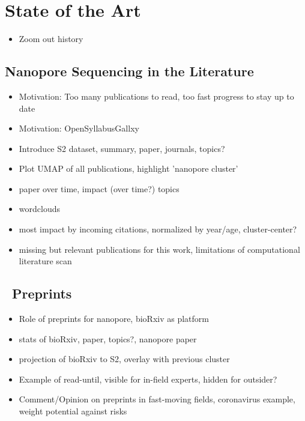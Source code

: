 \chapter{State of the Art}
\label{sec:state_of_art}

\begin{itemize}
    \item Zoom out history \cite{Deamer2016}
\end{itemize}

\section{Nanopore Sequencing in the Literature}

\begin{itemize}
    \item Motivation: Too many publications to read, too fast progress to stay up to date
    \item Motivation: OpenSyllabusGallxy
    \item Introduce S2 dataset, summary, paper, journals, topics?
    \item Plot UMAP of all publications, highlight 'nanopore cluster'
    \item paper over time, impact (over time?) topics
    \item wordclouds
    \item most impact by incoming citations, normalized by year/age, cluster-center?
    \item missing but relevant publications for this work, limitations of computational literature scan
\end{itemize}

\section{\Biorxiv\ Preprints}

\begin{itemize}
    \item Role of preprints for nanopore, bioRxiv as platform
    \item stats of bioRxiv, paper, topics?, nanopore paper
    \item projection of bioRxiv to S2, overlay with previous cluster
    \item Example of read-until, visible for in-field experts, hidden for outsider?
    \item Comment/Opinion on preprints in fast-moving fields, coronavirus example, weight potential against risks
\end{itemize}

